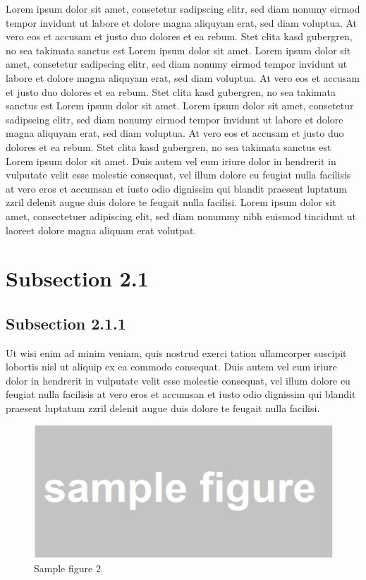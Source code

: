 \documentclass[11pt, a4paper, twoside]{report}
\begin{document}
Lorem ipsum dolor sit amet, consetetur sadipscing elitr, sed diam nonumy eirmod tempor invidunt ut labore et dolore magna aliquyam erat, sed diam voluptua. At vero eos et accusam et justo duo dolores et ea rebum. Stet clita kasd gubergren, no sea takimata sanctus est Lorem ipsum dolor sit amet. Lorem ipsum dolor sit amet, consetetur sadipscing elitr, sed diam nonumy eirmod tempor invidunt ut labore et dolore magna aliquyam erat, sed diam voluptua. At vero eos et accusam et justo duo dolores et ea rebum. Stet clita kasd gubergren, no sea takimata sanctus est Lorem ipsum dolor sit amet. Lorem ipsum dolor sit amet, consetetur sadipscing elitr, sed diam nonumy eirmod tempor invidunt ut labore et dolore magna aliquyam erat, sed diam voluptua. At vero eos et accusam et justo duo dolores et ea rebum. Stet clita kasd gubergren, no sea takimata sanctus est Lorem ipsum dolor sit amet.
Duis autem vel eum iriure dolor in hendrerit in vulputate velit esse molestie consequat, vel illum dolore eu feugiat nulla facilisis at vero eros et accumsan et iusto odio dignissim qui blandit praesent luptatum zzril delenit augue duis dolore te feugait nulla facilisi. Lorem ipsum dolor sit amet, consectetuer adipiscing elit, sed diam nonummy nibh euismod tincidunt ut laoreet dolore magna aliquam erat volutpat.


\section{Subsection 2.1} \label{sec:subsection_21}

\subsection{Subsection 2.1.1} \label{sec:subsection_211}

Ut wisi enim ad minim veniam, quis nostrud exerci tation ullamcorper suscipit lobortis nisl ut aliquip ex ea commodo consequat. Duis autem vel eum iriure dolor in hendrerit in vulputate velit esse molestie consequat, vel illum dolore eu feugiat nulla facilisis at vero eros et accumsan et iusto odio dignissim qui blandit praesent luptatum zzril delenit augue duis dolore te feugait nulla facilisi.

\begin{figure}[H]
  \centering 
  \includegraphics[width=1 \linewidth]{figs/fig_sample_1.pdf}
  \captionsetup{justification=raggedright, singlelinecheck=off, font=bf, belowskip=-0.5cm}
  \caption[Sample figure 2]{Sample figure 2}
  \label{fig:sample_2}
\end{figure} 
\end{document}
